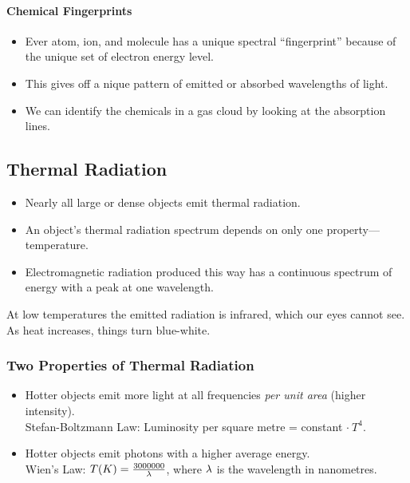 \documentclass[class=article, crop=false]{standalone}
\begin{document}
  \paragraph{Chemical Fingerprints}
  \begin{itemize}
    \item Ever atom, ion, and molecule has a unique spectral ``fingerprint'' because of the unique set of electron energy level.
    \item This gives off a nique pattern of emitted or absorbed wavelengths of light.
    \item We can identify the chemicals in a gas cloud by looking at the absorption lines.
  \end{itemize}
  \subsection{Thermal Radiation}
  \begin{itemize}
    \item Nearly all large or dense objects emit thermal radiation.
    \item An object's thermal radiation spectrum depends on only one property---temperature.
    \item Electromagnetic radiation produced this way has a continuous spectrum of energy with a peak at one wavelength.
  \end{itemize}
  At low temperatures the emitted radiation is infrared, which our eyes cannot see. As heat increases, things turn blue-white.
  \subsubsection{Two Properties of Thermal Radiation}
  \begin{itemize}
    \item Hotter objects emit more light at all frequencies \emph{per unit area} (higher intensity). \\
    Stefan-Boltzmann Law: Luminosity per square metre = constant $\cdot\ T^4$.
    \item Hotter objects emit photons with a higher average energy. \\
    Wien's Law: $T(K) = \frac{3000000}{\lambda}$, where $\lambda$ is the wavelength in nanometres.
  \end{itemize}
\end{document}
